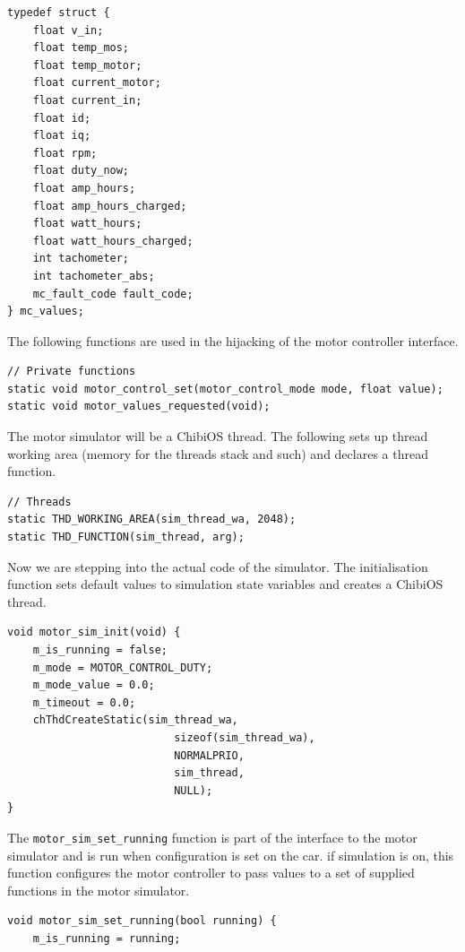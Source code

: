 \documentclass[12pt]{article} %
\begin{document}
{\begin{Verbatim}[samepage=true,frame=single,label=Embedded/RC\_Controller/datatypes.h]
typedef struct {
	float v_in;
	float temp_mos;
	float temp_motor;
	float current_motor;
	float current_in;
	float id;
	float iq;
	float rpm;
	float duty_now;
	float amp_hours;
	float amp_hours_charged;
	float watt_hours;
	float watt_hours_charged;
    int tachometer;
    int tachometer_abs;
    mc_fault_code fault_code;
} mc_values;
\end{Verbatim}


The following functions are used in the hijacking of the motor
controller interface. 
\begin{Verbatim}[samepage=true,frame=single,label=Embedded/RC\_Controller/motor\_sim.c]
// Private functions
static void motor_control_set(motor_control_mode mode, float value);
static void motor_values_requested(void);
\end{Verbatim}

The motor simulator will be a ChibiOS thread. The following sets up
thread working area (memory for the threads stack and such) and
declares a thread function.

\begin{Verbatim}[samepage=true,frame=single,label=Embedded/RC\_Controller/motor\_sim.c]
// Threads
static THD_WORKING_AREA(sim_thread_wa, 2048);
static THD_FUNCTION(sim_thread, arg);
\end{Verbatim}


Now we are stepping into the actual code of the simulator. The
initialisation function sets default values to simulation state
variables and creates a ChibiOS thread.
\begin{Verbatim}[samepage=true,frame=single,label=Embedded/RC\_Controller/motor\_sim.c]
void motor_sim_init(void) {
	m_is_running = false;
	m_mode = MOTOR_CONTROL_DUTY;
	m_mode_value = 0.0;
	m_timeout = 0.0;
	chThdCreateStatic(sim_thread_wa,
                          sizeof(sim_thread_wa),
                          NORMALPRIO,
                          sim_thread,
                          NULL);
}

\end{Verbatim}

The \verb!motor_sim_set_running! function is part of the interface to
the motor simulator and is run when configuration is set on the
car. if simulation is on, this function configures the motor
controller to pass values to a set of supplied functions in the motor
simulator.

\begin{Verbatim}[samepage=true,frame=single,label=Embedded/RC\_Controller/motor\_sim.c]
void motor_sim_set_running(bool running) {
	m_is_running = running;


\end{Verbatim}}
\end{document}
